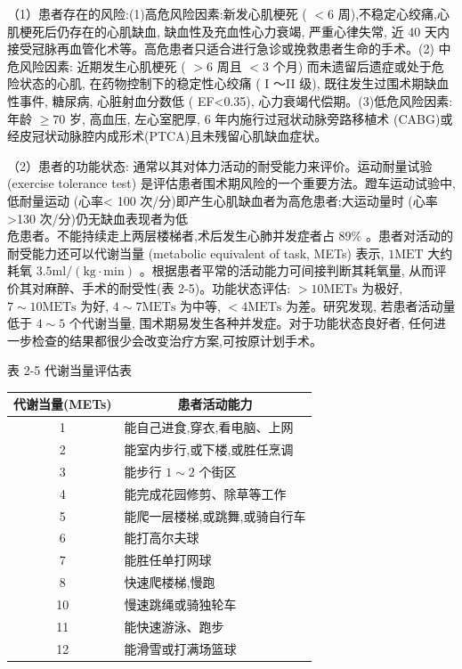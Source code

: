 \documentclass[10pt]{article}
\begin{document}
（1）患者存在的风险:(1)高危风险因素:新发心肌梗死 ( $<6$ 周),不稳定心绞痛,心肌梗死后仍存在的心肌缺血, 缺血性及充血性心力衰竭, 严重心律失常, 近 40 天内接受冠脉再血管化术等。高危患者只适合进行急诊或挽救患者生命的手术。(2) 中危风险因素: 近期发生心肌梗死 ( $>6$ 周且 $<3$ 个月) 而未遗留后遗症或处于危险状态的心肌, 在药物控制下的稳定性心绞痛 ( I ～II 级), 既往发生过围术期缺血性事件, 糖尿病, 心脏射血分数低 ( EF<0.35), 心力衰竭代偿期。(3)低危风险因素: 年龄 $\geqslant 70$ 岁, 高血压, 左心室肥厚, 6 年内施行过冠状动脉旁路移植术 (CABG)或经皮冠状动脉腔内成形术(PTCA)且未残留心肌缺血症状。

（2）患者的功能状态: 通常以其对体力活动的耐受能力来评价。运动耐量试验 (exercise tolerance test) 是评估患者围术期风险的一个重要方法。蹬车运动试验中,低耐量运动 (心率< 100 次/分)即产生心肌缺血者为高危患者;大运动量时 (心率>130 次/分)仍无缺血表现者为低\\
危患者。不能持续走上两层楼梯者,术后发生心肺并发症者占 $89 \%$ 。患者对活动的耐受能力还可以代谢当量 (metabolic equivalent of task, METs) 表示, $1 \mathrm{MET}$ 大约耗氧 $3.5 \mathrm{ml} /(\mathrm{kg} \cdot \mathrm{min})$ 。根据患者平常的活动能力可间接判断其耗氧量, 从而评价其对麻醉、手术的耐受性(表 2-5)。功能状态评估: $>10 \mathrm{METs}$ 为极好, $7 \sim 10 \mathrm{METs}$ 为好, $4 \sim 7 \mathrm{METs}$ 为中等, $<4 \mathrm{METs}$ 为差。研究发现, 若患者活动量低于 $4 \sim 5$ 个代谢当量, 围术期易发生各种并发症。对于功能状态良好者, 任何进一步检查的结果都很少会改变治疗方案,可按原计划手术。

表 2-5 代谢当量评估表

\begin{center}
\begin{tabular}{cl}
\hline
代谢当量(METs) & \multicolumn{1}{c}{患者活动能力} \\
\hline
1 & 能自己进食,穿衣,看电脑、上网 \\
2 & 能室内步行,或下楼,或胜任烹调 \\
3 & 能步行 $1 \sim 2$ 个街区 \\
4 & 能完成花园修剪、除草等工作 \\
5 & 能爬一层楼梯,或跳舞,或骑自行车 \\
6 & 能打高尔夫球 \\
7 & 能胜任单打网球 \\
8 & 快速爬楼梯,慢跑 \\
10 & 慢速跳绳或骑独轮车 \\
11 & 能快速游泳、跑步 \\
12 & 能滑雪或打满场篮球 \\
\hline
\end{tabular}
\end{center}
\end{document}
